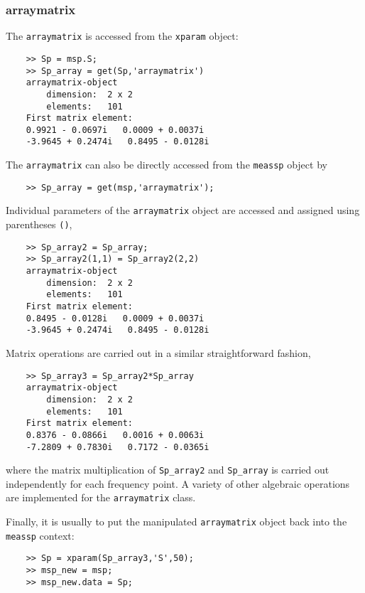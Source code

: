 \subsubsection{arraymatrix}
The \verb"arraymatrix" is accessed from the \verb"xparam" object:
\begin{small}
\begin{verbatim}
    >> Sp = msp.S;
    >> Sp_array = get(Sp,'arraymatrix')
    arraymatrix-object
        dimension:  2 x 2
        elements:   101
    First matrix element:
    0.9921 - 0.0697i   0.0009 + 0.0037i
    -3.9645 + 0.2474i   0.8495 - 0.0128i
\end{verbatim}
\end{small}
The \verb"arraymatrix" can also be directly accessed from the
\verb"meassp" object by
\begin{small}
\begin{verbatim}
    >> Sp_array = get(msp,'arraymatrix');
\end{verbatim}
\end{small}

Individual parameters of the \verb"arraymatrix" object are
accessed and assigned using parentheses \verb"()",
\begin{small}
\begin{verbatim}
    >> Sp_array2 = Sp_array;
    >> Sp_array2(1,1) = Sp_array2(2,2)
    arraymatrix-object
        dimension:  2 x 2
        elements:   101
    First matrix element:
    0.8495 - 0.0128i   0.0009 + 0.0037i
    -3.9645 + 0.2474i   0.8495 - 0.0128i
\end{verbatim}
\end{small}

Matrix operations are carried out in a similar straightforward fashion,
\begin{small}
\begin{verbatim}
    >> Sp_array3 = Sp_array2*Sp_array
    arraymatrix-object
        dimension:  2 x 2
        elements:   101
    First matrix element:
    0.8376 - 0.0866i   0.0016 + 0.0063i
    -7.2809 + 0.7830i   0.7172 - 0.0365i
\end{verbatim}
\end{small}
where the matrix multiplication of \verb"Sp_array2" and
\verb"Sp_array" is carried out independently for each frequency
point. A variety of other algebraic operations are implemented for
the \verb"arraymatrix" class.

Finally, it is usually to put the manipulated \verb"arraymatrix"
object back into the \verb"meassp" context:
\begin{small}
\begin{verbatim}
    >> Sp = xparam(Sp_array3,'S',50);
    >> msp_new = msp;
    >> msp_new.data = Sp;
\end{verbatim}
\end{small}

